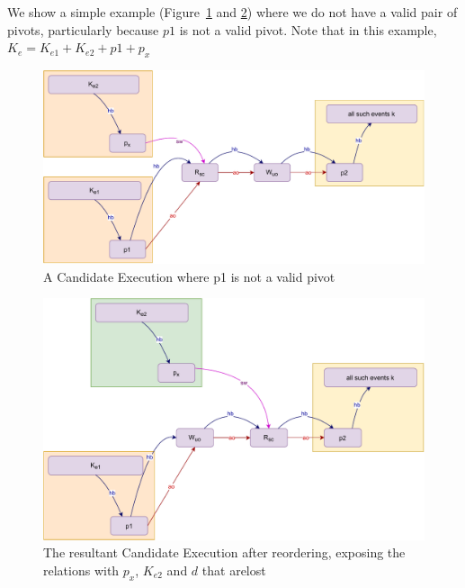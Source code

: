     We show a simple example (Figure~\ref{reord:preserve_hb(c)} and \ref{reord:preserve_hb(d)}) where we do not have a valid pair of pivots, particularly because $p1$ is not a valid pivot. Note that in this example, $K_e = K_{e1} + K_{e2} + p1 + p_x$
    \begin{figure}[H]
        \centering
        \includegraphics[scale=0.6]{5.InstructionReordering/4.ValidReorderingCandidate/ProofParts/Part1/part1(e).pdf}
        \caption{A Candidate Execution where p1 is not a valid pivot}
        \label{reord:preserve_hb(c)}
    \end{figure}
    
    \begin{figure}[H]
        \centering
        \includegraphics[scale=0.6]{5.InstructionReordering/4.ValidReorderingCandidate/ProofParts/Part1/part1(f).pdf}
        \caption{The resultant Candidate Execution after reordering, exposing the relations with $p_x$, $K_{e2}$ and $d$ that arelost}
        \label{reord:preserve_hb(d)}
    \end{figure}
        
